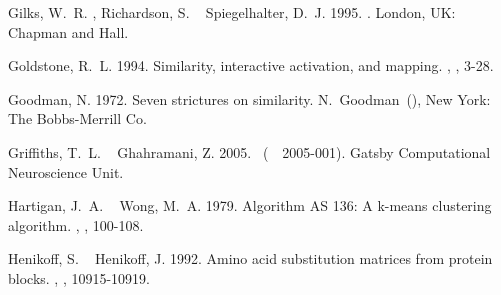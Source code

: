 \documentclass[11pt]{article}
\begin{document}
\begin{thebibliography}{}
%
%
Gilks, W.~R.%
, Richardson, S.%
\BCBL{}\ \BBA{} Spiegelhalter, D.~J.%
%
\newblock{}\BBOP{}1995\BBCP{}.
\newblock{}.
\newblock{}London, UK: Chapman and Hall.

%
%
Goldstone, R.~L.%
%
\newblock{}\BBOP{}1994\BBCP{}.
\newblock{}\BBOQ{}Similarity, interactive activation, and mapping.\BBCQ{}
\newblock{}, , 3-28.

%
%
Goodman, N.%
%
\newblock{}\BBOP{}1972\BBCP{}.
\newblock{}\BBOQ{}Seven strictures on similarity.\BBCQ{}
\newblock{}\BIn{} N.~Goodman\ (\BED), 
\newblock{}New York: The Bobbs-Merrill Co.

%
%
Griffiths, T.~L.%
\BCBT{}\ \BBA{} Ghahramani, Z.%
%
\newblock{}\BBOP{}2005\BBCP{}.
\newblock{}\ (\BTR{}\ \BNUM\ 2005-001).
\newblock{}Gatsby Computational Neuroscience Unit.

%
%
Hartigan, J.~A.%
\BCBT{}\ \BBA{} Wong, M.~A.%
%
\newblock{}\BBOP{}1979\BBCP{}.
\newblock{}\BBOQ{}Algorithm {AS} 136: A k-means clustering algorithm.\BBCQ{}
\newblock{}, , 100-108.

%
%
Henikoff, S.%
\BCBT{}\ \BBA{} Henikoff, J.%
%
\newblock{}\BBOP{}1992\BBCP{}.
\newblock{}\BBOQ{}Amino acid substitution matrices from protein blocks.\BBCQ{}
\newblock{}, ,
  10915-10919.


\end{thebibliography}
\end{document}
